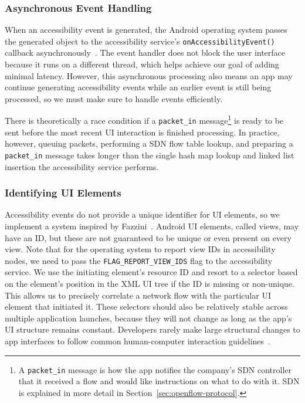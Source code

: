 \subsubsection{Asynchronous Event Handling}
\label{sec:asynchronous-event-handling}

When an accessibility event is generated, the Android operating system passes
the generated object to the accessibility service's
\texttt{onAccessibilityEvent()} callback
asynchronously~\cite{googledevelopers2020}. The event handler does not block the
user interface because it runs on a different thread, which helps achieve our
goal of adding minimal latency. However, this asynchronous processing also means
an app may continue generating accessibility events while an earlier event is
still being processed, so we must make sure to handle events efficiently.

There is theoretically a race condition if a \texttt{packet\_in}
message\footnote{A \texttt{packet\_in} message is how the app notifies the
	company's SDN controller that it received a flow and would like instructions
	on what to do with it. SDN is explained in more detail in
	Section~\ref{sec:openflow-protocol}.} is ready to be sent before the most
recent UI interaction is finished processing.  In practice, however, queuing
packets, performing a SDN flow table lookup, and preparing a \texttt{packet\_in}
message takes longer than the single hash map lookup and linked list insertion
the accessibility service performs.

\subsubsection{Identifying UI Elements}
\label{sec:identifying-ui-elements}

Accessibility events do not provide a unique identifier for UI elements, so we
implement a system inspired by Fazzini~\etal \cite{fazzini2017}. Android UI
elements, called views, may have an ID, but these are not guaranteed to be
unique or even present on every view. Note that for the operating system to
report view IDs in accessibility nodes, we need to pass the
\texttt{FLAG\_REPORT\_VIEW\_IDS} flag to the accessibility service. We use the
initiating element's resource ID and resort to a selector based on the element's
position in the XML UI tree if the ID is missing or non-unique. This allows us
to precisely correlate a network flow with the particular UI element that
initiated it. These selectors should also be relatively stable across multiple
application launches, because they will not change as long as the app's UI
structure remains constant. Developers rarely make large structural changes to
app interfaces to follow common human-computer interaction
guidelines~\cite{norman2013}.

